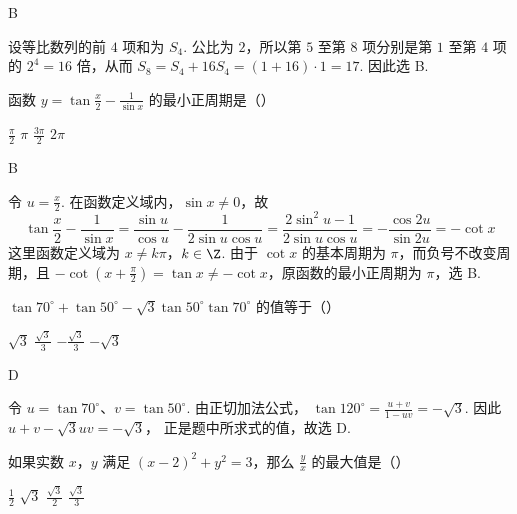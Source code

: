\begin{answer}
B
\end{answer}

\begin{solution}
设等比数列的前 \(4\) 项和为 \(S_4\). 公比为 \(2\)，所以第 \(5\) 至第 \(8\) 项分别是第 \(1\) 至第 \(4\) 项的 \(2^4=16\) 倍，从而
\(S_8=S_4+16S_4=(1+16)\cdot1=17\).
因此选 B.
\end{solution}

\begin{problem}
函数 \(y=\tan\frac{x}{2}-\frac{1}{\sin x}\) 的最小正周期是（\quad）

\choices
    {\(\frac{\pi}{2}\)}
    {\(\pi\)}
    {\(\frac{3\pi}{2}\)}
    {\(2\pi\)}
\end{problem}

\begin{answer}
B
\end{answer}

\begin{solution}
令 \(u=\frac{x}{2}\). 在函数定义域内，\(\sin x\ne0\)，故
\[
\tan\frac{x}{2}-\frac{1}{\sin x}
=\frac{\sin u}{\cos u}-\frac{1}{2\sin u\cos u}
=\frac{2\sin^2u-1}{2\sin u\cos u}
=-\frac{\cos 2u}{\sin 2u}
=-\cot x
\]
这里函数定义域为 \(x\ne k\pi\)，\(k\in\Z\). 由于 \(\cot x\) 的基本周期为 \(\pi\)，而负号不改变周期，且 \(-\cot\left(x+\frac{\pi}{2}\right)=\tan x\ne-\cot x\)，原函数的最小正周期为 \(\pi\)，选 B.
\end{solution}

\begin{problem}
\(\tan 70^{\circ} + \tan 50^{\circ} - \sqrt{3} \tan 50^{\circ} \tan 70^{\circ}\) 的值等于（\quad）

\choices
    {\(\sqrt{3}\)}
    {\(\frac{\sqrt{3}}{3}\)}
    {\(-\frac{\sqrt{3}}{3}\)}
    {\(-\sqrt{3}\)}
\end{problem}

\begin{answer}
D
\end{answer}

\begin{solution}
令 \(u=\tan70^\circ\)、\(v=\tan50^\circ\). 由正切加法公式，
\(\tan120^\circ=\frac{u+v}{1-uv}=-\sqrt{3}\).
因此
\(u+v-\sqrt{3}uv=-\sqrt{3}\)，
正是题中所求式的值，故选 D.
\end{solution}

\begin{problem}
如果实数 \(x\)，\(y\) 满足 \((x-2)^2+y^2=3\)，那么 \(\frac{y}{x}\) 的最大值是（\quad）

\choices
    {\(\frac{1}{2}\)}
    {\(\sqrt{3}\)}
    {\(\frac{\sqrt{3}}{2}\)}
    {\(\frac{\sqrt{3}}{3}\)}
\end{problem}

